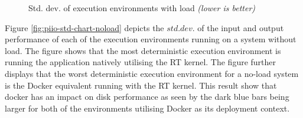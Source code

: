 \mydataload
\begin{figure}[H]
\caption{Std. dev. of execution environments with load \textit{(lower is better)}}
\label{fig:piio-std-chart-load}
\end{figure}


Figure \ref{fig:piio-std-chart-noload} depicts the $std. dev.$ of the input and output performance of each of the execution environments running on a system without load. The figure shows that the most deterministic execution environment is running the application natively utilising the RT kernel. The figure further displays that the worst deterministic execution environment for a no-load system is the Docker equivalent running with the RT kernel. This result show that docker has an impact on disk performance as seen by the dark blue bars being larger for both of the environments utilising Docker as its deployment context.

